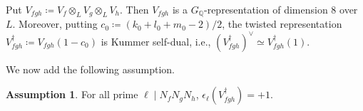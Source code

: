 \documentclass[a4paper,11pt]{amsart}
\theoremstyle{plain}
\theoremstyle{definition}
\newtheorem{ass}[theorem]{Assumption}
\theoremstyle{remark}
\newcommand{\bb}{\mathbb}
\newcommand{\cl}{\mathcal}
\DeclareMathOperator{\cyc}{cyc}
\newcommand{\Lp}{{\mathscr{L}_p}}
\newcommand{\ord}{{\mathrm{ord}}}
\newcommand{\hf}{{\mathbf{f}}}
\newcommand{\hg}{{\mathbf{g}}}
\newcommand{\hh}{{\mathbf h}}
\numberwithin{equation}{section}
\begin{document}
Put $V_{fgh}\coloneqq V_f\otimes_L V_g\otimes_L V_h$. Then $V_{fgh}$ is a $G_\bb{Q}$-representation of dimension $8$ over $L$. Moreover, putting $c_0\coloneqq(k_{0}+l_{0}+m_0-2)/2$, the twisted representation $V_{fgh}^\dagger\coloneqq V_{fgh}(1-c_0)$ is Kummer self-dual, i.e., $(V_{fgh}^\dagger)^\vee\simeq V_{fgh}^\dagger(1)$.


We now add the following assumption.

\begin{ass}
    For all prime $\ell\mid N_fN_gN_h$, $\epsilon_\ell(V_{fgh}^\dagger)=+1$.
\end{ass}










\end{document}
